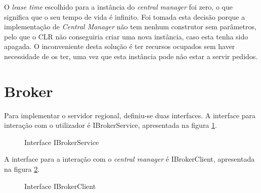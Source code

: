O \textit{lease time} escolhido para a instância do \textit{central manager} foi zero, o que significa que o seu tempo de vida é infinito. Foi tomada esta decisão porque a implementação de \textit{Central Manager} não tem nenhum construtor sem parâmetros, pelo que o CLR não conseguiria criar uma nova instância, caso esta tenha sido apagada. O inconveniente desta solução é ter recursos ocupados sem haver necessidade de os ter, uma vez que esta instância pode não estar a servir pedidos. 

\section{Broker} \label{broker}

Para implementar o servidor regional, definiu-se duas interfaces. A interface para interação com o utilizador é IBrokerService, apresentada na figura \ref{ibrokerservice}. 

\begin{figure}[h]
	\caption{Interface IBrokerService}
	\label{ibrokerservice}
\end{figure}

A interface para a interação com o \textit{central manager} é IBrokerClient, apresentada na figura \ref{ibrokerclient}.

\begin{figure}[h]
	\caption{Interface IBrokerClient}
	\label{ibrokerclient}
\end{figure}

